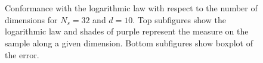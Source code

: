 \documentclass[1p]{elsarticle}
\begin{document}
\begin{figure}[!h]               
\centering
{}
~   


~   

\caption{Conformance with the logarithmic law with respect to the number of dimensions for $N_s=32$ and $d=10$. Top subfigures show the logarithmic law and shades of purple represent the measure on the sample along a given dimension. Bottom subfigures show boxplot of the error.}
\label{fig:boxplot}
\end{figure}
\end{document}
